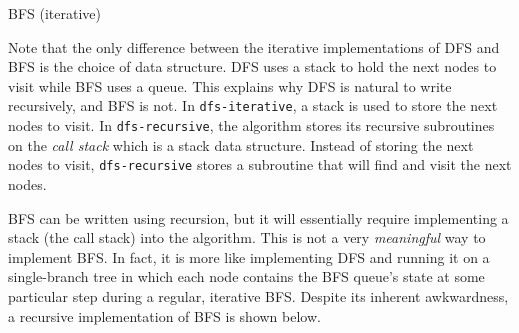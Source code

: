 \vspace{4mm}
\begin{algorithm}[H]
    \caption{BFS (iterative)}
\end{algorithm}
\vspace{5mm}

Note that the only difference between the iterative implementations of DFS and BFS is the choice of data structure. DFS uses a stack to hold the next nodes to visit while BFS uses a queue. This explains why DFS is natural to write recursively, and BFS is not. In \texttt{dfs-iterative}, a stack is used to store the next nodes to visit. In \texttt{dfs-recursive}, the algorithm stores its recursive subroutines on the \textit{call stack} which is a stack data structure. Instead of storing the next nodes to visit, \texttt{dfs-recursive} stores a subroutine that will find and visit the next nodes.

BFS can be written using recursion, but it will essentially require implementing a stack (the call stack) into the algorithm. This is not a very \textit{meaningful} way to implement BFS. In fact, it is more like implementing DFS and running it on a single-branch tree in which each node contains the BFS queue's state at some particular step during a regular, iterative BFS. Despite its inherent awkwardness, a recursive implementation of BFS is shown below.


